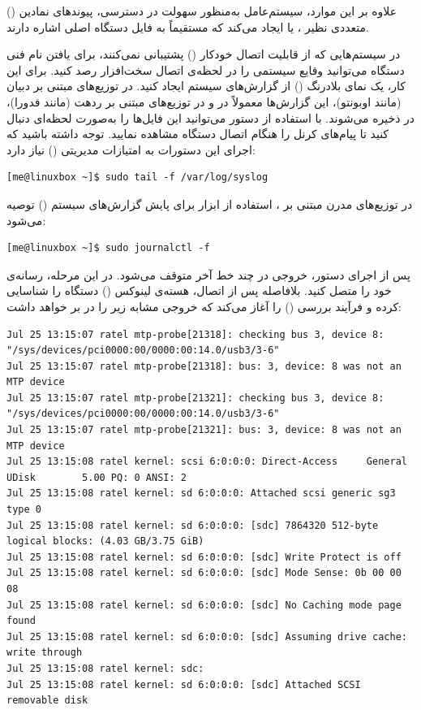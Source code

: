 علاوه بر این موارد، سیستم‌عامل به‌منظور سهولت در دسترسی، پیوندهای نمادین () متعددی نظیر ،  یا  ایجاد می‌کند که مستقیماً به فایل دستگاه اصلی اشاره دارند.

در سیستم‌هایی که از قابلیت اتصال خودکار () پشتیبانی نمی‌کنند، برای یافتن نام فنی دستگاه می‌توانید وقایع سیستمی را در لحظه‌ی اتصال سخت‌افزار رصد کنید. برای این کار، یک نمای بلادرنگ () از گزارش‌های سیستم ایجاد کنید. در توزیع‌های مبتنی بر دبیان (مانند اوبونتو)، این گزارش‌ها معمولاً در  و در توزیع‌های مبتنی بر ردهت (مانند فدورا)، در  ذخیره می‌شوند. با استفاده از دستور  می‌توانید این فایل‌ها را به‌صورت لحظه‌ای دنبال کنید تا پیام‌های کرنل را هنگام اتصال دستگاه مشاهده نمایید. توجه داشته باشید که اجرای این دستورات به امتیازات مدیریتی () نیاز دارد:

\begin{latin}
\begin{lstlisting}
[me@linuxbox ~]$ sudo tail -f /var/log/syslog
\end{lstlisting}
\end{latin}

در توزیع‌های مدرن مبتنی بر ، استفاده از ابزار  برای پایش گزارش‌های سیستم () توصیه می‌شود:

\begin{latin}
\begin{lstlisting}
[me@linuxbox ~]$ sudo journalctl -f
\end{lstlisting}
\end{latin}

پس از اجرای دستور، خروجی در چند خط آخر متوقف می‌شود. در این مرحله، رسانه‌ی خود را متصل کنید. بلافاصله پس از اتصال، هسته‌ی لینوکس () دستگاه را شناسایی کرده و فرآیند بررسی () را آغاز می‌کند که خروجی مشابه زیر را در بر خواهد داشت:

\begin{latin}
\begin{lstlisting}
Jul 25 13:15:07 ratel mtp-probe[21318]: checking bus 3, device 8: "/sys/devices/pci0000:00/0000:00:14.0/usb3/3-6"
Jul 25 13:15:07 ratel mtp-probe[21318]: bus: 3, device: 8 was not an MTP device
Jul 25 13:15:07 ratel mtp-probe[21321]: checking bus 3, device 8: "/sys/devices/pci0000:00/0000:00:14.0/usb3/3-6"
Jul 25 13:15:07 ratel mtp-probe[21321]: bus: 3, device: 8 was not an MTP device
Jul 25 13:15:08 ratel kernel: scsi 6:0:0:0: Direct-Access     General UDisk        5.00 PQ: 0 ANSI: 2
Jul 25 13:15:08 ratel kernel: sd 6:0:0:0: Attached scsi generic sg3 type 0
Jul 25 13:15:08 ratel kernel: sd 6:0:0:0: [sdc] 7864320 512-byte logical blocks: (4.03 GB/3.75 GiB)
Jul 25 13:15:08 ratel kernel: sd 6:0:0:0: [sdc] Write Protect is off
Jul 25 13:15:08 ratel kernel: sd 6:0:0:0: [sdc] Mode Sense: 0b 00 00 08
Jul 25 13:15:08 ratel kernel: sd 6:0:0:0: [sdc] No Caching mode page found
Jul 25 13:15:08 ratel kernel: sd 6:0:0:0: [sdc] Assuming drive cache: write through
Jul 25 13:15:08 ratel kernel: sdc:
Jul 25 13:15:08 ratel kernel: sd 6:0:0:0: [sdc] Attached SCSI removable disk
\end{lstlisting}
\end{latin}

